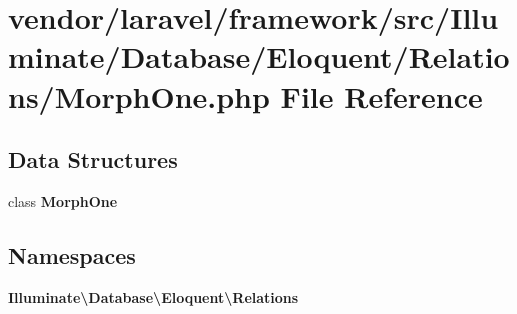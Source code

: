 \section{vendor/laravel/framework/src/\+Illuminate/\+Database/\+Eloquent/\+Relations/\+Morph\+One.php File Reference}
\label{_morph_one_8php}
\subsection*{Data Structures}
\begin{DoxyCompactItemize}
\item 
class {\bf Morph\+One}
\end{DoxyCompactItemize}
\subsection*{Namespaces}
\begin{DoxyCompactItemize}
\item 
 {\bf Illuminate\textbackslash{}\+Database\textbackslash{}\+Eloquent\textbackslash{}\+Relations}
\end{DoxyCompactItemize}

